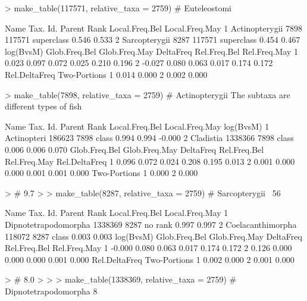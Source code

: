\documentclass{article}
\begin{document}
\begin{Schunk}
\begin{Sinput}
> make_table(117571, relative_taxa = 2759) # Euteleostomi
\end{Sinput}
\begin{Soutput}
            Name Tax. Id. Parent       Rank Local.Freq.Bel Local.Freq.May
1 Actinopterygii     7898 117571 superclass          0.546          0.533
2  Sarcopterygii     8287 117571 superclass          0.454          0.467
  log(BvsM) Glob.Freq.Bel Glob.Freq.May DeltaFreq Rel.Freq.Bel Rel.Freq.May
1     0.023         0.097         0.072     0.025        0.210        0.196
2    -0.027         0.080         0.063     0.017        0.174        0.172
  Rel.DeltaFreq Two-Portions
1         0.014        0.000
2         0.002        0.000
\end{Soutput}
\begin{Sinput}
> make_table(7898, relative_taxa = 2759) # Actinopterygii The subtaxa are different types of fish
\end{Sinput}
\begin{Soutput}
         Name Tax. Id. Parent  Rank Local.Freq.Bel Local.Freq.May log(BvsM)
1 Actinopteri   186623   7898 class          0.994          0.994    -0.000
2   Cladistia  1338366   7898 class          0.006          0.006     0.070
  Glob.Freq.Bel Glob.Freq.May DeltaFreq Rel.Freq.Bel Rel.Freq.May Rel.DeltaFreq
1         0.096         0.072     0.024        0.208        0.195         0.013
2         0.001         0.000     0.000        0.001        0.001         0.000
  Two-Portions
1        0.000
2        0.000
\end{Soutput}
\begin{Sinput}
> # 9.7% B and 7.2% M of all reads
> 
> make_table(8287, relative_taxa = 2759) # Sarcopterygii ~56%
\end{Sinput}
\begin{Soutput}
                  Name Tax. Id. Parent    Rank Local.Freq.Bel Local.Freq.May
1 Dipnotetrapodomorpha  1338369   8287 no rank          0.997          0.997
2    Coelacanthimorpha   118072   8287   class          0.003          0.003
  log(BvsM) Glob.Freq.Bel Glob.Freq.May DeltaFreq Rel.Freq.Bel Rel.Freq.May
1    -0.000         0.080         0.063     0.017        0.174        0.172
2     0.126         0.000         0.000     0.000        0.001        0.000
  Rel.DeltaFreq Two-Portions
1         0.002        0.000
2         0.001        0.000
\end{Soutput}
\begin{Sinput}
> # 8.0% B and 6.3% M
> 
> 
> make_table(1338369, relative_taxa = 2759) # Dipnotetrapodomorpha  8% B and 6.3% M

\end{Sinput}
\end{Schunk}
\end{document}
